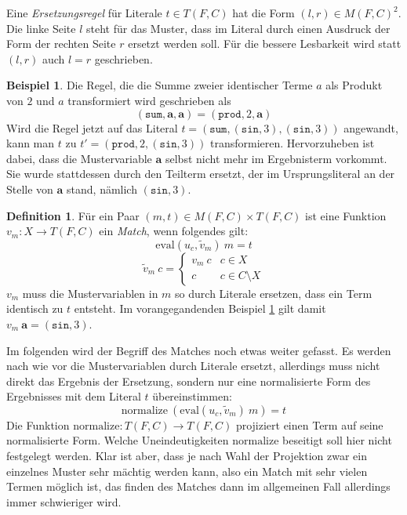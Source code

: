 \documentclass{scrartcl}
\numberwithin{figure}{section} %
\theoremstyle{definition} %
\begin{document}
Eine \emph{Ersetzungsregel} für Literale $t \in T(F, C)$ hat die Form $(l, r) \in M(F, C)^2$. Die linke Seite $l$ steht für das Muster, dass im Literal durch einen Ausdruck der Form der rechten Seite $r$ ersetzt werden soll. Für die bessere Lesbarkeit wird statt $(l, r)$ auch $l = r$ geschrieben.

\newtheorem{bMuster}[bsp]{Beispiel} 
\begin{bMuster} \label{bMuster}
Die Regel, die die Summe zweier identischer Terme $a$ als Produkt von $2$ und $a$ transformiert wird geschrieben als
$$(\texttt{sum}, \mathbf a, \mathbf a) = (\texttt{prod}, 2, \mathbf a)$$
Wird die Regel jetzt auf das Literal 
$t = (\texttt{sum}, (\texttt{sin}, 3), (\texttt{sin}, 3))$ angewandt, kann man $t$ zu $t' = (\texttt{prod}, 2, (\texttt{sin}, 3))$ transformieren. 
Hervorzuheben ist dabei, dass die Mustervariable $\mathbf a$ selbst nicht mehr im Ergebnisterm vorkommt. Sie wurde stattdessen durch den Teilterm ersetzt, der im Ursprungsliteral an der Stelle von $\mathbf a$ stand, nämlich $(\texttt{sin}, 3)$.
\end{bMuster}

\newtheorem{defMatch}[bsp]{Definition}
\begin{defMatch}
Für ein Paar $(m, t) \in M(F, C) \times T(F, C)$ ist eine Funktion $v_m \colon X \rightarrow T(F, C)$ ein \emph{Match}, wenn folgendes gilt:
$$\mathrm{eval}(u_c, \tilde v_m)~ m = t$$
$$\tilde v_m~ c = \begin{cases}
	v_m~ c & c \in X\\
	c      & c \in C \setminus X
\end{cases}$$
$v_m$ muss die Mustervariablen in $m$ so durch Literale ersetzen, dass ein Term identisch zu $t$ entsteht. 
Im vorangegandenden Beispiel \ref{bMuster} gilt damit $v_m~ \mathbf a = (\texttt{sin}, 3)$.

Im folgenden wird der Begriff des Matches noch etwas weiter gefasst. Es werden nach wie vor die Mustervariablen durch Literale ersetzt, allerdings muss nicht direkt das Ergebnis der Ersetzung, sondern nur eine normalisierte Form des Ergebnisses mit dem Literal $t$ übereinstimmen:
$$\mathrm{normalize}~(\mathrm{eval}(u_c, \tilde v_m)~ m) = t$$
Die Funktion $\mathrm{normalize} \colon T(F, C) \rightarrow T(F, C)$ projiziert einen Term auf seine normalisierte Form. Welche Uneindeutigkeiten $\mathrm{normalize}$ beseitigt soll hier nicht festgelegt werden. Klar ist aber, dass je nach Wahl der Projektion zwar ein einzelnes Muster sehr mächtig werden kann, also ein Match mit sehr vielen Termen möglich ist, das finden des Matches dann im allgemeinen Fall allerdings immer schwieriger wird.
\end{defMatch}
\end{document}
